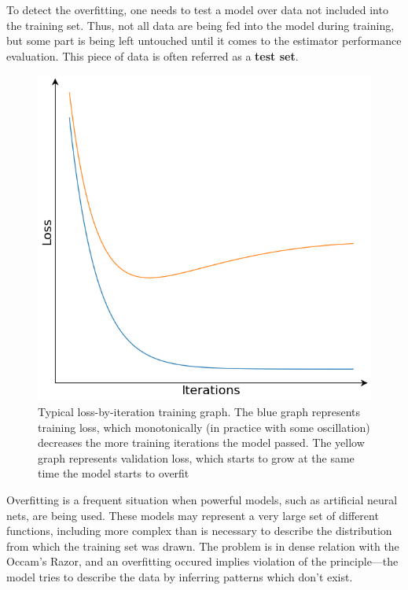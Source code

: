 \documentclass[thesis=B,english]{FITthesis}[2019/12/23]
\begin{document}
	
	To detect the overfitting, one needs to test a model over data not included into the training set. Thus, not all data are being fed into the model during training, but some part is being left untouched until it comes to the estimator performance evaluation. This piece of data is often referred as a \textbf{test set}.
	
	\begin{figure}[h]
		\includegraphics[scale=0.35]{images/generic_loss_graph.png}
		\centering
		\caption{Typical loss-by-iteration training graph. The blue graph represents training loss, which monotonically (in practice with some oscillation) decreases the more training iterations the model passed. The yellow graph represents validation loss, which starts to grow at the same time the model starts to overfit}
	\end{figure}
	
	Overfitting is a frequent situation when powerful models, such as artificial neural nets, are being used. These models may represent a very large set of different functions, including more complex than is necessary to describe the distribution from which the training set was drawn. The problem is in dense relation with the Occam's Razor, and an overfitting occured implies violation of the principle\cite{overfitting}---the model tries to describe the data by inferring patterns which don't exist.
	
\end{document}
